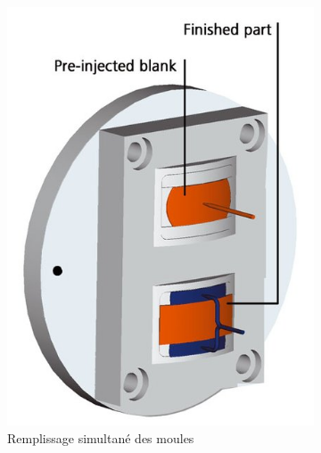 \documentclass[a4paper]{paper}
\begin{document}

\tableofcontents

\clearpage




\begin{figure}
        \centering
        \begin{subfigure}[b]{0.4\textwidth}
                \includegraphics[width=\textwidth]{images/two-shots-a}
                \caption{Remplissage simultané des moules}
        \end{subfigure}%
        ~ 
        \begin{subfigure}[b]{0.4\textwidth}

\end{subfigure}
\end{figure}
\end{document}
